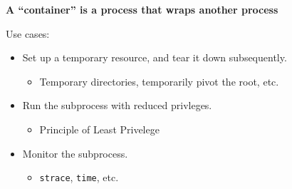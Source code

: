 \begin{frame}

\begin{center}

\large \textbf{A ``container'' is a process that wraps another process}

\end{center}

\pause

\vspace{\fill}

Use cases:

\begin{itemize}

\item Set up a temporary resource, and tear it down subsequently.

\begin{itemize}

\item Temporary directories, temporarily pivot the root, etc.

\end{itemize}

\item Run the subprocess with reduced privleges.

\begin{itemize}

\item Principle of Least Privelege

\end{itemize}

\item Monitor the subprocess.

\begin{itemize}

\item \texttt{strace}, \texttt{time}, etc.

\end{itemize}

\end{itemize}

\end{frame}


